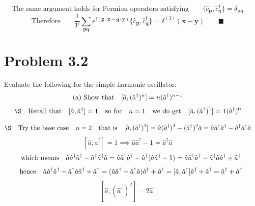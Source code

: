 \documentclass{amsart}
\begin{document}
\[\text{The same argument holds for Fermion operators satisfying}\qquad\{\hat{c}_{\boldsymbol{p}},\hat{c}^\dagger_{\boldsymbol{q}}\}  = \delta_{\boldsymbol{pq}}  \]
\[\text{Therefore}\qquad\frac{1}{\mathcal{V}}\sum_{\boldsymbol{pq}}e^{i(\boldsymbol{p\cdot x}-\boldsymbol{q\cdot y})}\{\hat{c}_{\boldsymbol{p}},\hat{c}^\dagger_{\boldsymbol{q}}\}=\delta^{(3)} (\boldsymbol{x}-\boldsymbol{y})\qquad\blacksquare\]

\section*{Problem 3.2}
Evaluate the following for the simple harmonic oscillator:
\[\qq*{(a) Show that}[\hat{a},(\hat{a}^\dagger)^n]= n(\hat{a}^\dagger)^{n-1}  \]
\[\S\qq{Recall that}[\hat{a},\hat{a}^\dagger] = 1\qq{so for}n=1\qq{we do get}[\hat{a},(\hat{a}^\dagger)^1] =1(\hat{a}^\dagger)^0 \]

\[\S\qq{Try the base case} n=2\qq{that is}[\hat{a},(\hat{a}^\dagger)^2] = \hat{a}(\hat{a}^\dagger)^2-(\hat{a}^\dagger)^2 \hat{a} = \hat{a}\hat{a}^\dagger \hat{a}^\dagger-\hat{a}^\dagger \hat{a}^\dagger \hat{a}   \]
\[[\hat{a},\hat{a}^\dagger] = 1 \implies \hat{a}\hat{a}^\dagger -1 =  \hat{a}^\dagger \hat{a}\]
\[\qq{which means}\hat{a}\hat{a}^\dagger \hat{a}^\dagger-\hat{a}^\dagger \hat{a}^\dagger \hat{a} =\hat{a}\hat{a}^\dagger \hat{a}^\dagger-\hat{a}^\dagger (\hat{a}\hat{a}^\dagger -1 ) =\hat{a}\hat{a}^\dagger \hat{a}^\dagger-\hat{a}^\dagger \hat{a}\hat{a}^\dagger +\hat{a}^\dagger\]
\[\qq{hence}\hat{a}\hat{a}^\dagger \hat{a}^\dagger-\hat{a}^\dagger \hat{a}\hat{a}^\dagger +\hat{a}^\dagger=(\hat{a}\hat{a}^\dagger -\hat{a}^\dagger \hat{a})\hat{a}^\dagger +\hat{a}^\dagger   =[\hat{a},\hat{a}^\dagger] \hat{a}^\dagger +\hat{a}^\dagger  = \hat{a}^\dagger +\hat{a}^\dagger \]
\[ [\hat{a},(\hat{a}^\dagger)^2]   =2\hat{a}^\dagger \]
\end{document}
